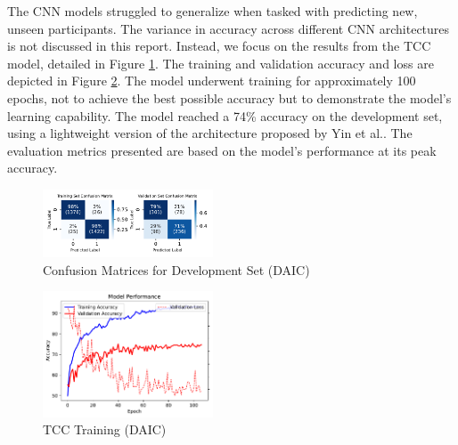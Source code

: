 The CNN models struggled to generalize when tasked with predicting new, unseen participants. The variance in accuracy across different CNN architectures is not discussed in this report. Instead, we focus on the results from the TCC model, detailed in Figure \ref{fig:confusion_matrices_TCC_daic}.
The training and validation accuracy and loss are depicted in Figure \ref{fig:training_TCC_daic}. The model underwent training for approximately 100 epochs, not to achieve the best possible accuracy but to demonstrate the model’s learning capability.
The model reached a 74\% accuracy on the development set, using a lightweight version of the architecture proposed by Yin et al.\cite{yin2023depression}. The evaluation metrics presented are based on the model's performance at its peak accuracy.

\begin{figure}[H]
    \centering
    \includegraphics[width=0.45\textwidth]{vis_pdf/TCC_FINAL.pdf} %
    \caption{Confusion Matrices for Development Set (DAIC)}
    \label{fig:confusion_matrices_TCC_daic}
\end{figure}

\begin{figure}[H]
    \centering
    \includegraphics[width=0.45\textwidth]{vis_pdf/TCC_model_perf.pdf}
    \caption{TCC Training (DAIC)}
    \label{fig:training_TCC_daic}
\end{figure}



